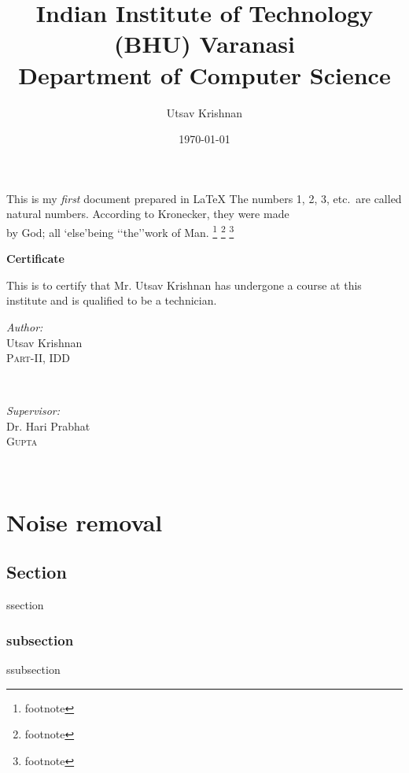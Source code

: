 \documentclass[a4paper]{report}
\title{Indian Institute of Technology (BHU) Varanasi\\
Department of Computer Science}
\author{Utsav Krishnan}
\date\today
\begin{document}
\maketitle

This is my \emph{first} document prepared in \LaTeX
The numbers 1, 2, 3, etc.\ are called natural numbers. According to Kronecker\cite{a1}, they were made\\[5pt]
by God; all \lq else\rq being \lq\lq the\rq\rq work of Man.
\footnote{footnote}
\footnote{footnote}
\footnote{footnote}
\newpage
\begin{center}
\textbf{\huge Certificate}\\[50pt]
\end{center}

This is to certify that Mr. Utsav Krishnan has undergone a course at this institute and is qualified to be a technician.
\\[20pt]

\begin{minipage}{0.4\textwidth}
\begin{flushleft} \large
\emph{Author:}\\
Utsav Krishnan \\%
\textsc{Part-II, IDD}
\end{flushleft}
\end{minipage}
~
\begin{minipage}{0.55\textwidth}
\begin{flushright} \large
\emph{Supervisor:} \\
Dr. Hari Prabhat\\
\textsc{Gupta} %
\end{flushright}
\end{minipage}\\[0cm]


\tableofcontents

\listoffigures

\listoftables

\chapter{Noise removal}
\section{Section}
ssection
\subsection{subsection}
ssubsection
\end{document}
